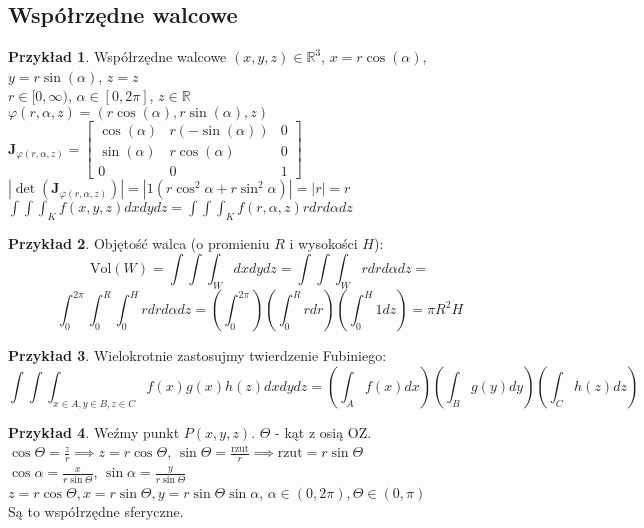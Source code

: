 \documentclass{article}
\theoremstyle{definition}
\theoremstyle{definition}
\theoremstyle{definition}
\newtheorem{pk}{Przykład}[subsection]
\theoremstyle{definition}
\begin{document}
\subsection{Współrzędne walcowe}

\begin{pk}
    Współrzędne walcowe $(x,y,z)\in\mathbb{R}^3$, $x=r\cos(\alpha)$, $y=r\sin(\alpha)$, $z=z$\\
    $r\in[0,\infty)$, $\alpha\in[0,2\pi]$, $z\in\mathbb{R}$\\
    $\varphi(r,\alpha,z) = (r\cos(\alpha),r\sin(\alpha),z)$\\
    $\mathbf{J}_{\varphi(r,\alpha,z)} = \begin{bmatrix}\cos(\alpha)&r(-\sin(\alpha))&0\\\sin(\alpha)&r\cos(\alpha)&0\\0&0&1\end{bmatrix}$\\
    $|\det(\mathbf{J}_{\varphi(r,\alpha,z)})| = |1\left(r\cos^2\alpha + r\sin^2\alpha\right)| = |r| = r$\\
    $\int\int\int_{K} f(x,y,z) dx dy dz = \int\int\int_{K} f(r,\alpha,z) r dr d\alpha dz$
\end{pk}

\begin{pk}
    Objętość walca (o promieniu $R$ i wysokości $H$):
    \[\text{Vol}(W) = \int\int\int_{W} dx dy dz = \int\int\int_{W} r dr d\alpha dz =\] 
    \[\int_{0}^{2\pi} \int_{0}^{R} \int_{0}^{H} r dr d\alpha dz = \left(\int_{0}^{2\pi}\right) \left(\int_{0}^{R} rdr\right) \left(\int_{0}^{H} 1dz\right) = \pi R^2 H\]
\end{pk}

\begin{pk}
    Wielokrotnie zastosujmy twierdzenie Fubiniego:
    \[\int\int\int_{x\in A, y\in B, z\in C} f(x)g(x)h(z) dxdydz = \left(\int_A f(x)dx\right)\left(\int_B g(y) dy\right)\left(\int_C h(z) dz\right)\]
\end{pk}

\begin{pk}
    Weźmy punkt $P(x,y,z)$. $\Theta $ - kąt z osią OZ.\\
    $\cos\Theta = \frac{z}{r} \implies z=r\cos\Theta$,
    $\sin\Theta = \frac{\text{rzut}}{r} \implies \text{rzut} = r\sin\Theta$\\
    $\cos\alpha = \frac{x}{r\sin\Theta}$,
    $\sin\alpha = \frac{y}{r\sin\Theta}$\\
    $z=r\cos\Theta, x=r\sin\Theta, y=r\sin\Theta \sin\alpha$,
    $\alpha\in(0,2\pi), \Theta\in(0,\pi)$\\
    Są to współrzędne sferyczne.    
\end{pk}
\end{document}
